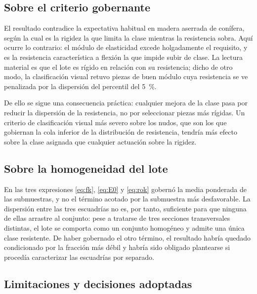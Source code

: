 \documentclass[11pt,a4paper]{article}
\begin{document}
\subsection{Sobre el criterio gobernante}

El resultado contradice la expectativa habitual en madera aserrada de conífera, según la
cual es la rigidez la que limita la clase mientras la resistencia sobra. Aquí ocurre lo
contrario: el módulo de elasticidad excede holgadamente el requisito, y es la resistencia
característica a flexión la que impide subir de clase. La lectura material es que el
lote es rígido en relación con su resistencia; dicho de otro modo, la clasificación
visual retuvo piezas de buen módulo cuya resistencia se ve penalizada por la dispersión
del percentil del \SI{5}{\percent}.

De ello se sigue una consecuencia práctica: cualquier mejora de la clase pasa por
reducir la dispersión de la resistencia, no por seleccionar piezas más rígidas. Un
criterio de clasificación visual más severo sobre los nudos, que son los que gobiernan
la cola inferior de la distribución de resistencia, tendría más efecto sobre la clase
asignada que cualquier actuación sobre la rigidez.

\subsection{Sobre la homogeneidad del lote}
\label{sec:homogeneidad}

En las tres expresiones \eqref{eq:fk}, \eqref{eq:E0} y \eqref{eq:rok} gobernó la media
ponderada de las submuestras, y no el término acotado por la submuestra más
desfavorable. La dispersión entre las tres escuadrías no es, por tanto, suficiente para
que ninguna de ellas arrastre al conjunto: pese a tratarse de tres secciones
transversales distintas, el lote se comporta como un conjunto homogéneo y admite una
única clase resistente. De haber gobernado el otro término, el resultado habría quedado
condicionado por la fracción más débil y habría sido obligado plantearse si procedía
caracterizar las escuadrías por separado.

\subsection{Limitaciones y decisiones adoptadas}
\end{document}
